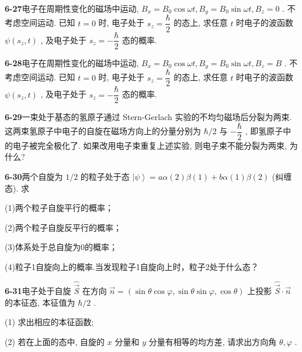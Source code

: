 \vfill

\newpage

\textbf{6-27}\quad 电子在周期性变化的磁场中运动, $\displaystyle B_{x} = B_{0}\cos \omega t, B_{y} = B_{0}\sin \omega t, B_{z} = 0$ . 不考虑空间运动. 已知 $\displaystyle t = 0$ 时, 电子处于 $\displaystyle s_{z} = \dfrac{\hbar}{2}$ 的态上, 求任意 $\displaystyle t$ 时电子的波函数 $\displaystyle \psi(s_{z}, t)$ , 及电子处于 $\displaystyle s_{z} = -\dfrac{\hbar}{2}$ 态的概率.

\vfill

\newpage

\textbf{6-28}\quad 电子在周期性变化的磁场中运动, $\displaystyle B_{x} = B_{0}\cos \omega t, B_{y} = B_{0}\sin \omega t, B_{z} = B$ . 不考虑空间运动. 已知 $\displaystyle t = 0$ 时, 电子处于 $\displaystyle s_{z} = \dfrac{\hbar}{2}$ 的态上, 求任意 $\displaystyle t$ 时电子的波函数 $\displaystyle \psi(s_{z}, t)$ , 及电子处于 $\displaystyle s_{z} = -\dfrac{\hbar}{2}$ 态的概率.

\vfill

\newpage

\textbf{6-29}\quad 一束处于基态的氢原子通过 Stern-Gerlach 实验的不均匀磁场后分裂为两束. 这两束氢原子中电子的自旋在磁场方向上的分量分别为 $\displaystyle \hbar / 2$ 与 $\displaystyle -\dfrac{\hbar}{2}$ , 即氢原子中的电子被完全极化了. 如果改用电子束重复上述实验, 则电子束不能分裂为两束, 为什么?

\vfill

\newpage

\textbf{6-30}\quad 两个自旋为 $\displaystyle 1/2$ 的粒子处于态 $\displaystyle \left|\psi\right\rangle = a\alpha(2)\beta(1) + b\alpha(1)\beta(2)$ (纠缠态). 求

(1)两个粒子自旋平行的概率；

(2)两个粒子自旋反平行的概率；

(3)体系处于总自旋为0的概率；

(4)粒子1自旋向上的概率.当发现粒子1自旋向上时，粒子2处于什么态？

\vfill

\newpage

\textbf{6-31}\quad 电子处于自旋 $\displaystyle \hat{\vec{S}}$ 在方向 $\displaystyle \vec{n} = (\sin \theta \cos \varphi, \sin \theta \sin \varphi, \cos \theta)$ 上投影 $\displaystyle \hat{\vec{S}} \cdot \vec{n}$ 的本征态, 本征值为 $\displaystyle \hbar / 2$ .

(1) 求出相应的本征函数;

(2) 若在上面的态中, 自旋的 $\displaystyle x$ 分量和 $\displaystyle y$ 分量有相等的均方差, 请求出方向角 $\displaystyle \theta, \varphi$ .

